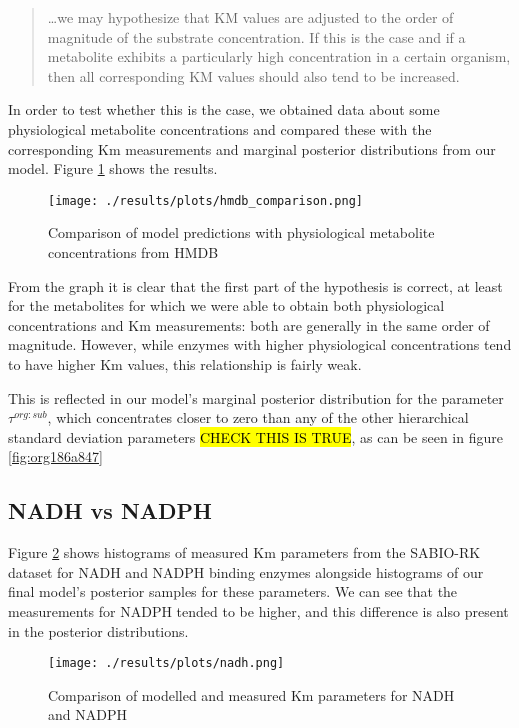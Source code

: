 \documentclass[11pt]{article}
\begin{document}
\begin{quote}
\ldots{}we may hypothesize that KM values are adjusted to the order of magnitude of
the substrate concentration. If this is the case and if a metabolite exhibits a
particularly high concentration in a certain organism, then all corresponding KM
values should also tend to be increased.
\end{quote}

In order to test whether this is the case, we obtained data about some
physiological metabolite concentrations and compared these with the
corresponding Km measurements and marginal posterior distributions from our
model. Figure \ref{fig:org58d4e0d} shows the results.

\begin{figure}[htbp]
\centering
\texttt{[image: ./results/plots/hmdb\_comparison.png]}
\caption{\label{fig:org58d4e0d}Comparison of model predictions with physiological metabolite concentrations from HMDB}
\end{figure}

From the graph it is clear that the first part of the hypothesis is correct, at
least for the metabolites for which we were able to obtain both physiological
concentrations and Km measurements: both are generally in the same order of
magnitude. However, while enzymes with higher physiological concentrations tend
to have higher Km values, this relationship is fairly weak.

This is reflected in our model's marginal posterior distribution for the
parameter \(\tau^{org:sub}\), which concentrates closer to zero than any of the
other hierarchical standard deviation parameters \hl{CHECK THIS IS TRUE}, as can be
seen in figure \ref{fig:org186a847}

\subsection{NADH vs NADPH}
\label{sec:org5dbee81}

Figure \ref{fig:org5972ca6} shows histograms of measured Km parameters from the SABIO-RK
dataset for NADH and NADPH binding enzymes alongside histograms of our final
model's posterior samples for these parameters. We can see that the measurements
for NADPH tended to be higher, and this difference is also present in the posterior
distributions.

\begin{figure}[htbp]
\centering
\texttt{[image: ./results/plots/nadh.png]}
\caption{\label{fig:org5972ca6}Comparison of modelled and measured Km parameters for NADH and NADPH}
\end{figure}
\end{document}
